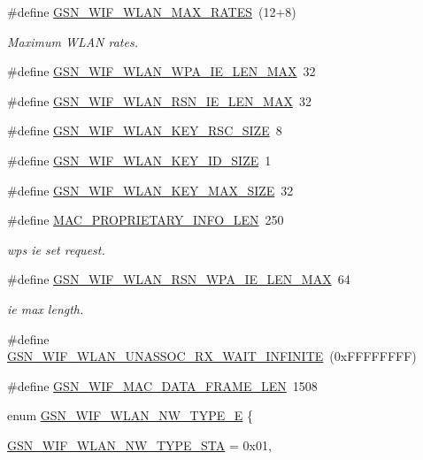 \begin{DoxyCompactItemize}
\item 
\#define \hyperlink{a00677_ga1bec540337ad0475486c1dcc1dd60aa2}{GSN\_\-WIF\_\-WLAN\_\-MAX\_\-RATES}~(12+8)
\begin{DoxyCompactList}\small\item\em Maximum WLAN rates. \end{DoxyCompactList}\item 
\#define \hyperlink{a00677_gac384187529d8e8d49764778d35cb15c6}{GSN\_\-WIF\_\-WLAN\_\-WPA\_\-IE\_\-LEN\_\-MAX}~32
\item 
\#define \hyperlink{a00677_ga275d137a8bc7f90a904a86cd30f7be8c}{GSN\_\-WIF\_\-WLAN\_\-RSN\_\-IE\_\-LEN\_\-MAX}~32
\item 
\#define \hyperlink{a00677_ga0677cf76723bfaf90a5756b1cee19702}{GSN\_\-WIF\_\-WLAN\_\-KEY\_\-RSC\_\-SIZE}~8
\item 
\#define \hyperlink{a00677_ga9678201a85ac27c5443dc024f7858e15}{GSN\_\-WIF\_\-WLAN\_\-KEY\_\-ID\_\-SIZE}~1
\item 
\#define \hyperlink{a00677_ga482d5027f475077e97383b1dfabf4508}{GSN\_\-WIF\_\-WLAN\_\-KEY\_\-MAX\_\-SIZE}~32
\item 
\#define \hyperlink{a00677_ga061dde080c4358e4caf65cfb37d5c3cd}{MAC\_\-PROPRIETARY\_\-INFO\_\-LEN}~250
\begin{DoxyCompactList}\small\item\em wps ie set request. \end{DoxyCompactList}\item 
\#define \hyperlink{a00677_gad043f51474c04cc30a14d7d36d0d38f4}{GSN\_\-WIF\_\-WLAN\_\-RSN\_\-WPA\_\-IE\_\-LEN\_\-MAX}~64
\begin{DoxyCompactList}\small\item\em ie max length. \end{DoxyCompactList}\item 
\#define \hyperlink{a00677_ga156c406dfb5900a2fbc4a629ff39b794}{GSN\_\-WIF\_\-WLAN\_\-UNASSOC\_\-RX\_\-WAIT\_\-INFINITE}~(0xFFFFFFFF)
\item 
\#define \hyperlink{a00677_ga32d6df65630d2b7926144dee1c854916}{GSN\_\-WIF\_\-MAC\_\-DATA\_\-FRAME\_\-LEN}~1508
\item 
enum \hyperlink{a00677_ga4d89b2a0c901a8c766f195897f16623f}{GSN\_\-WIF\_\-WLAN\_\-NW\_\-TYPE\_\-E} \{ \par
\hyperlink{a00640_gga4d89b2a0c901a8c766f195897f16623faa311500f825dc8fd0001c0d8a6917605}{GSN\_\-WIF\_\-WLAN\_\-NW\_\-TYPE\_\-STA} =  0x01, 
\par

\end{DoxyCompactItemize}
